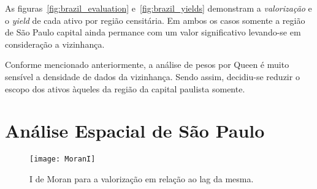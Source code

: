 As figuras~\ref{fig:brazil_evaluation} e~\ref{fig:brazil_yields} demonstram a \emph{valorização} e o \emph{yield} de cada ativo por região censitária. Em ambos os casos somente a região de São Paulo capital ainda permance com um valor significativo levando-se em consideração a vizinhança. 

Conforme mencionado anteriormente, a análise de pesos por Queen é muito sensível a densidade de dados da vizinhança. Sendo assim, decidiu-se reduzir o escopo dos ativos àqueles da região da capital paulista somente.

\section{Análise Espacial de São Paulo}
\label{sec:spatial_analysis_sao_paulo}

\begin{center}
\begin{figure}
\begin{centering}
\texttt{[image: MoranI]}
\par\end{centering}
\caption{\label{fig:moran_i} I de Moran para a valorização em relação ao lag da mesma.} 
\end{figure}
\vspace*{-44pt}
\end{center}

